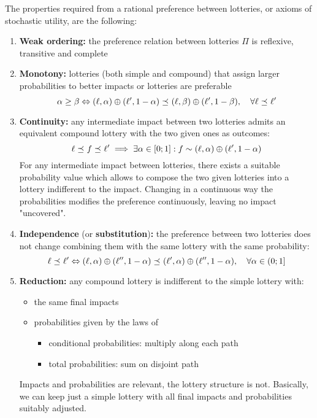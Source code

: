 The properties required from a rational preference between lotteries, or axioms of stochastic utility, are the following: 
\begin{enumerate}
	\item \textbf{Weak ordering:} the preference relation between lotteries $\Pi$ is reflexive, transitive and complete
	
	\item \textbf{Monotony:} lotteries (both simple and compound) that assign larger probabilities to better impacts or lotteries are preferable
	$$ \alpha \geq \beta \Leftrightarrow (\ell, \alpha) \oplus (\ell', 1 - \alpha) \preceq_{} (\ell, \beta) \oplus (\ell', 1 - \beta), \quad \forall \ell \preceq_{} \ell' $$
	
	\item \textbf{Continuity:} any intermediate impact between two lotteries admits an equivalent compound lottery with the two given ones as outcomes: 
	$$ \ell \preceq_{} f \preceq_{} \ell' \implies \exists \alpha \in [0;1] : f \sim (\ell, \alpha) \oplus (\ell', 1 - \alpha) $$
	For any intermediate impact between lotteries, there exists a suitable probability value which allows to compose the two given lotteries into a lottery indifferent to the impact. Changing in a continuous way the probabilities modifies the preference continuously, leaving no impact "uncovered".
	
	\item \textbf{Independence} (or \textbf{substitution})\textbf{:} the preference between two lotteries does not change combining them with the same lottery with the same probability:
	$$ \ell \preceq_{} \ell' \Leftrightarrow (\ell, \alpha) \oplus (\ell'', 1 - \alpha) \preceq_{} (\ell', \alpha) \oplus (\ell'', 1-\alpha), \quad \forall \alpha \in (0;1] $$
	
	\item \textbf{Reduction:} any compound lottery is indifferent to the simple lottery with: 
	\begin{itemize}
		\item the same final impacts
		
		\item probabilities given by the laws of
		\begin{itemize}
			\item conditional probabilities: multiply along each path
			
			\item total probabilities: sum on disjoint path
		\end{itemize}
	\end{itemize}
	Impacts and probabilities are relevant, the lottery structure is not. Basically, we can keep just a simple lottery with all final impacts and probabilities suitably adjusted.
\end{enumerate}


